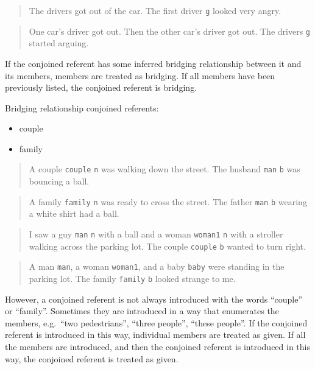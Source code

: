 \documentclass[
]{book}
\providecommand{\tightlist}{%
  \setlength{\itemsep}{0pt}\setlength{\parskip}{0pt}}
\begin{document}
\begin{quote}
The drivers got out of the car.
The first driver \texttt{g} looked very angry.
\end{quote}

\begin{quote}
One car's driver got out.
Then the other car's driver got out.
The drivers \texttt{g} started arguing.
\end{quote}

If the conjoined referent has some inferred bridging relationship between it and its members, members are treated as bridging.
If all members have been previously listed, the conjoined referent is bridging.

Bridging relationship conjoined referents:

\begin{itemize}
\tightlist
\item
  couple
\item
  family
\end{itemize}

\begin{quote}
A couple \texttt{couple} \texttt{n} was walking down the street.
The husband \texttt{man} \texttt{b} was bouncing a ball.
\end{quote}

\begin{quote}
A family \texttt{family} \texttt{n} was ready to cross the street.
The father \texttt{man} \texttt{b} wearing a white shirt had a ball.
\end{quote}

\begin{quote}
I saw a guy \texttt{man} \texttt{n} with a ball and a woman \texttt{woman1} \texttt{n} with a stroller walking across the parking lot.
The couple \texttt{couple} \texttt{b} wanted to turn right.
\end{quote}

\begin{quote}
A man \texttt{man}, a woman \texttt{woman1}, and a baby \texttt{baby} were standing in the parking lot.
The family \texttt{family} \texttt{b} looked strange to me.
\end{quote}

However, a conjoined referent is not always introduced with the words ``couple'' or ``family''.
Sometimes they are introduced in a way that enumerates the members, e.g.~``two pedestrians'', ``three people'', ``these people''.
If the conjoined referent is introduced in this way, individual members are treated as given.
If all the members are introduced, and then the conjoined referent is introduced in this way, the conjoined referent is treated as given.
\end{document}
